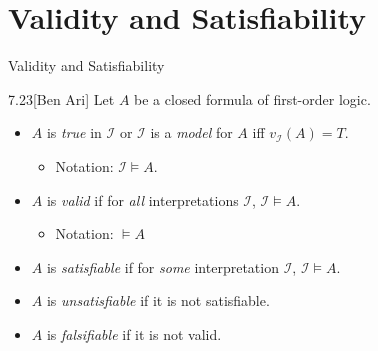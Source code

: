 \documentclass[style=sailor,size=12pt]{powerdot}
\begin{document}
\section[slide=true]{Validity and Satisfiability}

\begin{wideslide}[bm=,toc=]{Validity and Satisfiability}
\begin{defn}{7.23}[Ben Ari]
Let $A$ be a closed formula of first-order logic.
\end{defn}
\vspace{-2ex}
\begin{itemize}
\item<2-> $A$ is \emph{true} in $\mathcal{I}$ or $\mathcal{I}$ is a \emph{model} for
$A$ iff $v_{\mathcal{I}}(A) = T$. 
\begin{itemize}
\item<3-> Notation: $\mathcal{I} \models A$.
\end{itemize}
\item<4-> $A$ is \emph{valid} if for \emph{all} interpretations $\mathcal{I}$,
$\mathcal{I} \models A$. 
\begin{itemize}
\item<5-> Notation: $\models A$ 
\end{itemize}
\item<6-> $A$ is \emph{satisfiable} if for \emph{some} interpretation $\mathcal{I}$,
$\mathcal{I} \models A$.
\item<7-> $A$ is \emph{unsatisfiable} if it is not satisfiable. 
\item<8-> $A$ is \emph{falsifiable} if it is not valid. 
\end{itemize}

\end{wideslide}
\end{document}
